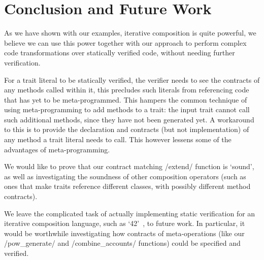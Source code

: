 \section{Conclusion and Future Work}\label{s:conc}
As we have shown with our examples, iterative composition is quite powerful, we believe we can use this power together with our approach to perform complex code transformations over statically verified code, without needing further verification. 

For a trait literal to be statically verified, the verifier needs to see the contracts of any methods called within it, this precludes such literals from referencing code that has yet to be meta-programmed. This hampers the common technique of using meta-programming to add methods to a trait: the input trait cannot call such additional methods, since they have not been generated yet. A workaround to this is to provide the declaration and contracts (but not implementation) of any method a trait literal needs to call. This however lessens some of the advantages of meta-programming.

We would like to prove that our contract matching /extend/ function is `sound', as well as investigating the soundness of other composition operators (such as ones that make traits reference different classes, with possibly different method contracts).

We leave the complicated task of actually implementing static verification for an iterative composition language, such as `42'~\cite{l42}, to future work. In particular, it would be worthwhile investigating how contracts of meta-operations (like our /pow_generate/ and /combine_accounts/ functions) could be specified and verified.